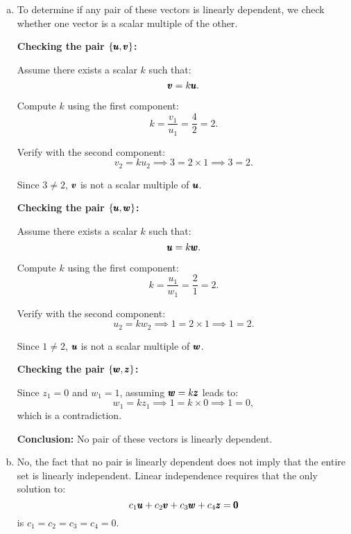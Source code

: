\begin{solution}
    \begin{enumerate}[(a)]
        \item 
        To determine if any pair of these vectors is linearly dependent, we check whether one vector is a scalar multiple of the other.
        
        \textbf{Checking the pair $\{\pmb{u}, \pmb{v}\}$:}
        
        Assume there exists a scalar $k$ such that:
        \[
        \pmb{v} = k \pmb{u}.
        \]
        
        Compute $k$ using the first component:
        \[
        k = \dfrac{v_1}{u_1} = \dfrac{4}{2} = 2.
        \]
        
        Verify with the second component:
        \[
        v_2 = k u_2 \implies 3 = 2 \times 1 \implies 3 = 2.
        \]
        
        Since $3 \ne 2$, $\pmb{v}$ is not a scalar multiple of $\pmb{u}$.
        
        \textbf{Checking the pair $\{\pmb{u}, \pmb{w}\}$:}
        
        Assume there exists a scalar $k$ such that:
        \[
        \pmb{u} = k \pmb{w}.
        \]
        
        Compute $k$ using the first component:
        \[
        k = \dfrac{u_1}{w_1} = \dfrac{2}{1} = 2.
        \]
        
        Verify with the second component:
        \[
        u_2 = k w_2 \implies 1 = 2 \times 1 \implies 1 = 2.
        \]
        
        Since $1 \ne 2$, $\pmb{u}$ is not a scalar multiple of $\pmb{w}$.
        
        \textbf{Checking the pair $\{\pmb{w}, \pmb{z}\}$:}
        
        Since $z_1 = 0$ and $w_1 = 1$, assuming $\pmb{w} = k \pmb{z}$ leads to:
        \[
        w_1 = k z_1 \implies 1 = k \times 0 \implies 1 = 0,
        \]
        which is a contradiction.
        
        \textbf{Conclusion:} No pair of these vectors is linearly dependent.
    
        \item No, the fact that no pair is linearly dependent does not imply that the entire set is linearly independent. Linear independence requires that the only solution to:
        \[
        c_1 \pmb{u} + c_2 \pmb{v} + c_3 \pmb{w} + c_4 \pmb{z} = \pmb{0}
        \]
        is $c_1 = c_2 = c_3 = c_4 = 0$.
        

\end{enumerate}
\end{solution}
